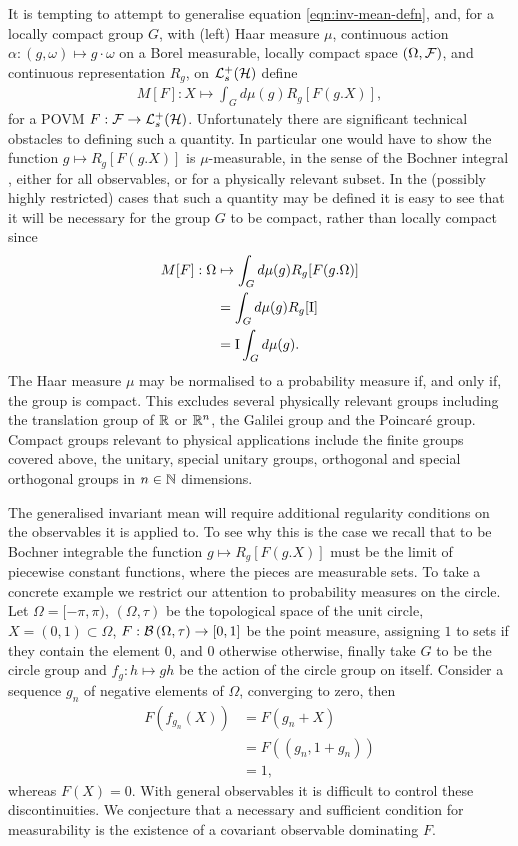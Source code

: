 It is tempting to attempt to generalise equation \eqref{eqn:inv-mean-defn}, and, for a locally compact group $G$, with (left) Haar measure $\mu$, continuous action $\alpha: (g,\omega)\mapsto g\cdot\omega$ on a Borel measurable, locally compact space $(\Omega, \mathcal{F})$, and continuous representation $R_g$, on $\posops[\hcal]$ define
\begin{align}
  M[F]: X\mapsto\int_G d\mu(g) R_g[F(g.X)],
\end{align}
for a POVM $F:\fcal\to\posops[\hcal]$. Unfortunately there are significant technical obstacles to defining such a quantity. In particular one would have to show the function $g\mapsto R_g[F(g.X)]$ is $\mu$-measurable, in the sense of the Bochner integral \cite{measure-theory-cohn}, either for all observables, or for a physically relevant subset. In the (possibly highly restricted) cases that such a quantity may be defined it is easy to see that it will be necessary for the group $G$ to be compact, rather than locally compact since
\begin{align}
  M[F]:\Omega&\mapsto\int_G d\mu(g) R_g[F(g.\Omega)]\\
             &=\int_G d\mu(g) R_g[\operatorname{I}]\\
             &=\operatorname{I}\int_G d\mu(g).\label{eqn:inv-mean-identity-infinite-case}
\end{align}
The Haar measure $\mu$ may be normalised to a probability measure if, and only if, the group is compact. This excludes several physically relevant groups including the translation group of $\mathbb{R}$ or $\mathbb{R}^n$, the Galilei group and the Poincar{\'e} group. Compact groups relevant to physical applications include the finite groups covered above, the unitary, special unitary groups, orthogonal and special orthogonal groups in $n\in\mathbb{N}$ dimensions. 

The generalised invariant mean will require additional regularity conditions on the observables it is applied to. To see why this is the case we recall that to be Bochner integrable the function $g\mapsto R_g[F(g.X)]$ must be the limit of piecewise constant functions, where the pieces are measurable sets. To take a concrete example we restrict our attention to probability measures on the circle. Let $\Omega=[-\pi,\pi)$, $(\Omega, \tau)$ be the topological space of the unit circle, $X=(0,1)\subset\Omega$, $F:\borel{\Omega}[\tau]\to [0,1]$ be the point measure, assigning $1$ to sets if they contain the element $0$, and $0$ otherwise otherwise, finally take $G$ to be the circle group and $f_g:h\mapsto gh$ be the action of the circle group on itself. Consider a sequence $g_n$ of negative elements of $\Omega$, converging to zero, then
\begin{align}
  F(f_{g_n}(X)) &= F(g_n + X)\\
                &= F( (g_n, 1+g_n))\\
                &= 1,
\end{align}
whereas $F(X) = 0$. With general observables it is difficult to control these discontinuities. We conjecture that a necessary and sufficient condition for measurability is the existence of a covariant observable dominating $F$.


